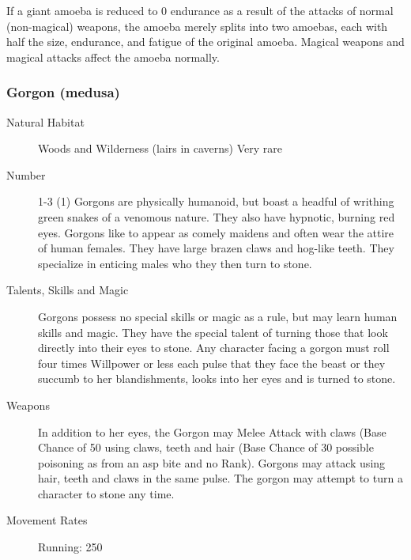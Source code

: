\begin{multicols}{2}
\begin{description}
\setlength\itemsep{0pt}

\item[Comments] If a giant amoeba is reduced to 0 endurance as a result of
the attacks of normal (non-magical) weapons, the amoeba merely splits
into two amoebas, each with half the size, endurance, and fatigue of
the original amoeba. Magical weapons and magical attacks affect the
amoeba normally.

\end{description}

\subsubsection{Gorgon (medusa)}

\begin{description}
\item[Natural Habitat] Woods and Wilderness (lairs in caverns) Very rare 

\item[Number]  1-3 (1)
 Gorgons are physically humanoid, but boast a headful of
writhing green snakes of a venomous nature. They also have hypnotic,
burning red eyes. Gorgons like to appear as comely maidens and often
wear the attire of human females.  They have large brazen claws and
hog-like teeth. They specialize in enticing males who they then turn
to stone.

\item[Talents, Skills and Magic] Gorgons possess no special skills or magic as a rule, but
may learn human skills and magic. They have the special talent of
turning those that look directly into their eyes to stone. Any
character facing a gorgon must roll four times Willpower or less each
pulse that they face the beast or they succumb to her blandishments,
looks into her eyes and is turned to stone.

\item[Weapons] In addition to her eyes, the Gorgon may Melee Attack with
claws (Base Chance of 50%
using claws, teeth and hair (Base Chance of 30%
possible poisoning as from an asp bite and no Rank). Gorgons may
attack using hair, teeth and claws in the same pulse. The gorgon may
attempt to turn a character to stone any time.


\item[Movement Rates] Running: 250


\end{description}
\end{multicols}
